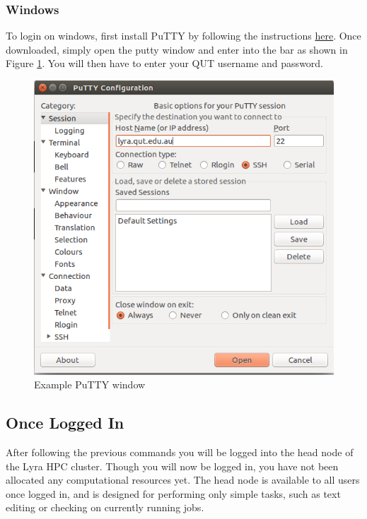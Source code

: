 \subsubsection{Windows}
To login on windows, first install PuTTY by following the instructions \href{https://www.putty.org/}{here}. Once downloaded, simply open the putty window and enter  into the bar as shown in Figure \ref{fig:putty}. You will then have to enter your QUT username and password.
\begin{figure}[!h]
  \centering
  \includegraphics[width=0.5\linewidth]{./figs/putty.png}
  \caption{Example PuTTY window}
  \label{fig:putty}
\end{figure}
%
%
\subsection{Once Logged In}
After following the previous commands you will be logged into the head node of the Lyra HPC cluster. Though you will now be logged in, you have not been allocated any computational resources yet. The head node is available to all users once logged in, and is designed for performing only simple tasks, such as text editing or checking on currently running jobs.
%
%
\par
%
%
